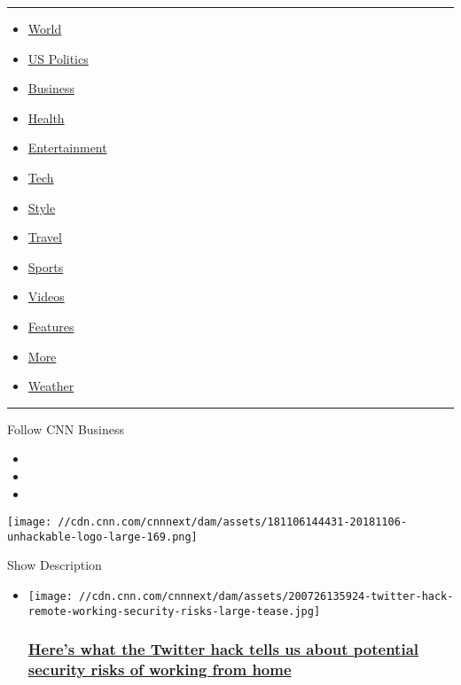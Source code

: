\begin{center}\rule{0.5\linewidth}{\linethickness}\end{center}

\begin{itemize}
\tightlist
\item
  \href{/world}{World}
\item
  \href{/politics}{US Politics}
\item
  \href{/business}{Business}
\item
  \href{/health}{Health}
\item
  \href{/entertainment}{Entertainment}
\item
  \href{/business/tech}{Tech}
\item
  \href{/style}{Style}
\item
  \href{/travel}{Travel}
\item
  \href{/sport}{Sports}
\item
  \href{/videos}{Videos}
\item
  \href{/specials}{Features}
\item
  \href{/more}{More}
\item
  \href{/weather}{Weather}
\end{itemize}

\begin{center}\rule{0.5\linewidth}{\linethickness}\end{center}

Follow CNN Business

\begin{itemize}
\item
\item
\item
\end{itemize}

\texttt{[image: //cdn.cnn.com/cnnnext/dam/assets/181106144431-20181106-unhackable-logo-large-169.png]}

Show Description

\begin{itemize}
\item
  \href{/2020/07/26/tech/twitter-hack-remote-working-security-risks/index.html}{}

  \texttt{[image: //cdn.cnn.com/cnnnext/dam/assets/200726135924-twitter-hack-remote-working-security-risks-large-tease.jpg]}

  \hypertarget{heres-what-the-twitter-hack-tells-us-about-potential-security-risks-of-working-from-home}{%
  \subsubsection{\texorpdfstring{\href{/2020/07/26/tech/twitter-hack-remote-working-security-risks/index.html}{Here's
  what the Twitter hack tells us about potential security risks of
  working from
  home}}{Here's what the Twitter hack tells us about potential security risks of working from home}}\label{heres-what-the-twitter-hack-tells-us-about-potential-security-risks-of-working-from-home}}
\end{itemize}

